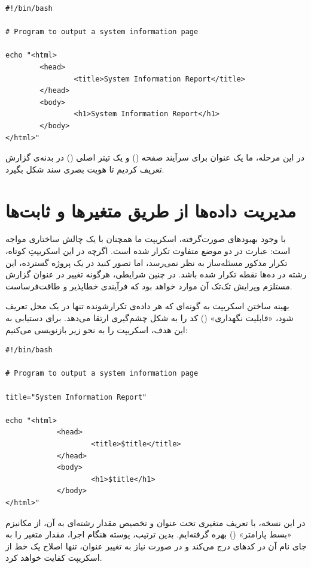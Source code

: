\begin{latin}
\begin{lstlisting}
#!/bin/bash

# Program to output a system information page

echo "<html>
        <head>
                <title>System Information Report</title>
        </head>
        <body>
                <h1>System Information Report</h1>
        </body>
</html>"
\end{lstlisting}
\end{latin}

در این مرحله، ما یک عنوان برای سرآیند صفحه () و یک تیتر اصلی () در بدنه‌ی گزارش تعریف کردیم تا هویت بصری سند شکل بگیرد.

\section{مدیریت داده‌ها از طریق متغیرها و ثابت‌ها}

با وجود بهبودهای صورت‌گرفته، اسکریپت ما همچنان با یک چالش ساختاری مواجه است: عبارت  در دو موضع متفاوت تکرار شده است. اگرچه در این اسکریپتِ کوتاه، تکرار مذکور مسئله‌ساز به نظر نمی‌رسد، اما تصور کنید در یک پروژه گسترده، این رشته در ده‌ها نقطه تکرار شده باشد. در چنین شرایطی، هرگونه تغییر در عنوان گزارش مستلزم ویرایش تک‌تک آن موارد خواهد بود که فرآیندی خطا‌پذیر و طاقت‌فرساست.

بهینه ساختن اسکریپت به گونه‌ای که هر داده‌ی تکرار‌شونده تنها در یک محل تعریف شود، «قابلیت نگهداری» () کد را به شکل چشم‌گیری ارتقا می‌دهد. برای دستیابی به این هدف، اسکریپت را به نحو زیر بازنویسی می‌کنیم:

\begin{latin}
\begin{lstlisting}
#!/bin/bash

# Program to output a system information page

title="System Information Report"

echo "<html>
            <head>
                    <title>$title</title>
            </head>
            <body>
                    <h1>$title</h1>
            </body>
</html>"
\end{lstlisting}
\end{latin}

در این نسخه، با تعریف متغیری تحت عنوان  و تخصیص مقدار رشته‌ای به آن، از مکانیزم «بسط پارامتر» () بهره گرفته‌ایم. بدین ترتیب، پوسته هنگام اجرا، مقدار متغیر را به جای نام آن در کدهای  درج می‌کند و در صورت نیاز به تغییر عنوان، تنها اصلاح یک خط از اسکریپت کفایت خواهد کرد.

